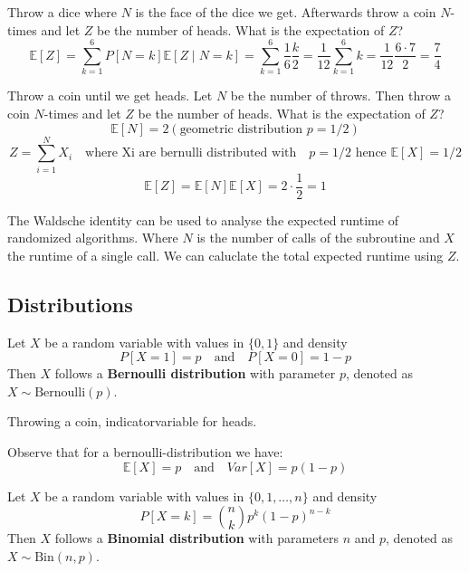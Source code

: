 \begin{example}
    Throw a dice where $N$ is the face of the dice we get. Afterwards throw a coin $N$-times and let $Z$ be the number of heads. What is the expectation of $Z$?
    $$\mathbb{E}[Z] = \sum_{k=1}^6 P[N=k] \mathbb{E}[Z \mid N=k] = \sum_{k=1}^6 \frac{1}{6} \frac{k}{2} = \frac{1}{12} \sum_{k=1}^6 k = \frac{1}{12} \frac{6 \cdot 7}{2} = \frac{7}{4}$$
\end{example}

\begin{example}
    Throw a coin until we get heads. Let $N$ be the number of throws. Then throw a coin $N$-times and let $Z$ be the number of heads. What is the expectation of $Z$?
    $$\mathbb{E}[N] = 2 (\text{geometric distribution } p = 1/2)$$
    $$Z = \sum_{i=1}^N X_i \quad \text{where Xi are bernulli distributed with} \quad p = 1/2 \text{ hence } \mathbb{E}[X] = 1/2$$
    $$\mathbb{E}[Z] = \mathbb{E}[N] \mathbb{E}[X] = 2 \cdot \frac{1}{2} = 1$$
\end{example}

\begin{remark}
    The Waldsche identity can be used to analyse the expected runtime of randomized algorithms. Where $N$ is the number of calls of the subroutine and $X$ the runtime of a single call. We can caluclate the total expected runtime using $Z$.
\end{remark}

\subsection{Distributions}

\begin{definition}
    Let $X$ be a random variable with values in $\{0,1\}$ and density
    $$P[X=1] = p \quad \text{and} \quad P[X=0] = 1-p$$
    Then $X$ follows a \textbf{Bernoulli distribution} with parameter $p$, denoted as $X \sim \text{Bernoulli}(p)$.
\end{definition}

\begin{example}
    Throwing a coin, indicatorvariable for heads.
\end{example}

\begin{remark}
    Observe that for a bernoulli-distribution we have:
    $$\mathbb{E}[X] = p \quad \text{and} \quad Var[X] = p(1-p)$$
\end{remark}

\begin{definition}
    Let $X$ be a random variable with values in $\{0,1,\dots,n\}$ and density
    $$P[X=k] = \binom{n}{k} p^k (1-p)^{n-k}$$
    Then $X$ follows a \textbf{Binomial distribution} with parameters $n$ and $p$, denoted as $X \sim \text{Bin}(n,p)$.
\end{definition}

